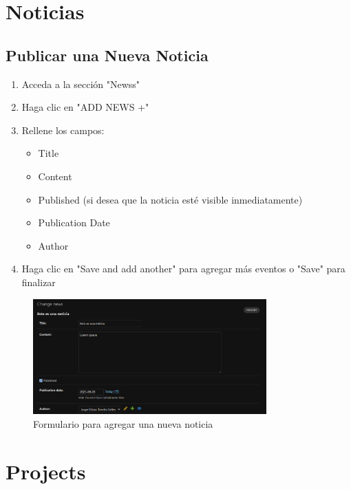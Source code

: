 \documentclass[12pt,letterpaper]{report}
\begin{document}
\section{Noticias}
\subsection{Publicar una Nueva Noticia}
\begin{enumerate}
    \item Acceda a la sección "Newss"
    \item Haga clic en "ADD NEWS +"
    \item Rellene los campos:
        \begin{itemize}
            \item Title
            \item Content
            \item Published (si desea que la noticia esté visible inmediatamente)
            \item Publication Date
            \item Author
        \end{itemize}
    \item Haga clic en "Save and add another" para agregar más eventos o "Save" para finalizar
\end{enumerate}

\begin{figure}[H]
    \centering
    \includegraphics[width=0.8\textwidth]{images/news.png}
    \caption{Formulario para agregar una nueva noticia}
\end{figure}

\section{Projects}
\end{document}
